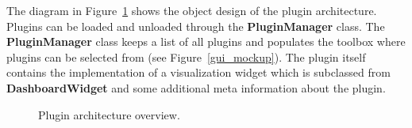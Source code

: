 The diagram in Figure~\ref{plugin_architecture_diagram} shows the object design of the plugin architecture. Plugins can be loaded and unloaded through the \textbf{PluginManager} class. The \textbf{PluginManager} class keeps a list of all plugins and populates the toolbox where plugins can be selected from (see Figure~\ref{gui_mockup}). The plugin itself contains the implementation of a visualization widget which is subclassed from \textbf{DashboardWidget} and some additional meta information about the plugin.

\begin{figure}[htb]
  \centering
  \caption{Plugin architecture overview.}
  \label{plugin_architecture_diagram}
\end{figure}
